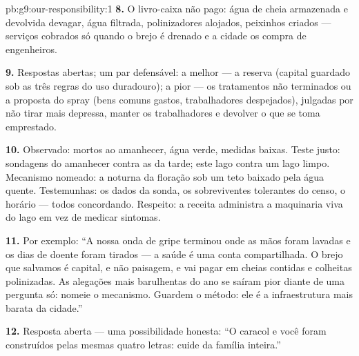 \begin{solution}{pb:g9:our-responsibility:1}
\textbf{8.} O livro-caixa não pago: água de cheia armazenada
e devolvida devagar, água filtrada, polinizadores alojados,
peixinhos criados --- serviços cobrados só quando o brejo é
drenado e a cidade os compra de engenheiros.

\textbf{9.} Respostas abertas; um par defensável: a melhor
--- a reserva (capital guardado sob as três regras do uso
duradouro); a pior --- os tratamentos não terminados ou a
proposta do spray (bens comuns gastos, trabalhadores
despejados), julgadas por não tirar mais depressa, manter os
trabalhadores e devolver o que se toma emprestado.

\textbf{10.} Observado:  mortos ao amanhecer, água
verde, medidas baixas. Teste justo: sondagens do amanhecer
contra as da tarde; este lago contra um lago limpo. Mecanismo
nomeado: a  noturna da floração sob um teto baixado
pela água quente. Testemunhas: os dados da sonda, os
sobreviventes tolerantes do censo, o horário --- todos
concordando. Respeito: a receita administra a maquinaria viva
do lago em vez de medicar sintomas.

\textbf{11.} Por exemplo: ``A nossa onda de gripe terminou
onde as mãos foram lavadas e os dias de doente foram tirados
--- a saúde é uma conta compartilhada. O brejo que salvamos é
capital, e não paisagem, e vai pagar em cheias contidas e
colheitas polinizadas. As alegações mais barulhentas do ano
se saíram pior diante de uma pergunta só: nomeie o mecanismo.
Guardem o método: ele é a infraestrutura mais barata da
cidade.''

\textbf{12.} Resposta aberta --- uma possibilidade honesta:
``O caracol e você foram construídos pelas mesmas quatro
letras: cuide da família inteira.''
\end{solution}
